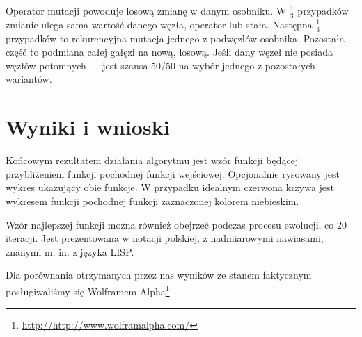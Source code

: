 \documentclass{classrep2}
\begin{document}
Operator mutacji powoduje losową zmianę w danym osobniku. W $\frac{1}{3}$ przypadków zmianie ulega sama wartość danego węzła, operator lub stała. Następna $\frac{1}{3}$ przypadków to rekurencyjna mutacja jednego z podwęzłów osobnika. Pozostała część to podmiana całej gałęzi na nową, losową. Jeśli dany węzeł nie posiada węzłów potomnych --- jest szansa 50/50 na wybór jednego z pozostałych wariantów.

\section {Wyniki i wnioski}
Końcowym rezultatem działania algorytmu jest wzór funkcji będącej przybliżeniem funkcji pochodnej funkcji wejściowej. Opcjonalnie rysowany jest wykres ukazujący obie funkcje. W przypadku idealnym czerwona krzywa jest wykresem funkcji pochodnej funkcji zaznaczonej kolorem niebieskim.

Wzór najlepszej funkcji można również obejrzeć podczas procesu ewolucji, co 20 iteracji. Jest prezentowana w notacji polskiej, z nadmiarowymi nawiasami, znanymi m. in. z języka LISP.

Dla porównania otrzymanych przez nas wyników ze stanem faktycznym posługiwaliśmy się Wolframem Alpha\footnote{\url{http://http://www.wolframalpha.com/}}.
\end{document}
